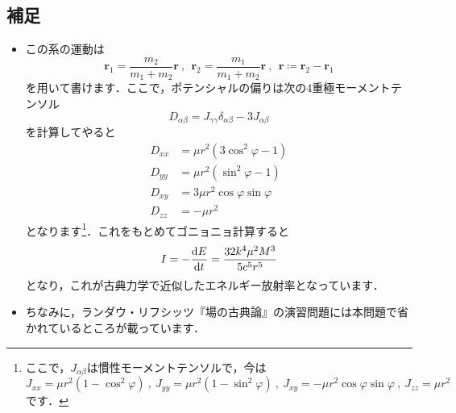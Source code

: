 \documentclass[a4paper,pdflatex,ja=standard]{bxjsarticle}
\begin{document}
\subsection*{補足}

\begin{itemize}
  \item 
  この系の運動は
  \begin{equation}
    \bm{r}_{1}
    =
    \frac{m_{2}}{m_{1}+m_{2}}\bm{r}
    \ ,\ \ 
    \bm{r}_{2}
    =
    \frac{m_{1}}{m_{1}+m_{2}}\bm{r}
    \ ,\ \ 
    \bm{r}
    \coloneqq
    \bm{r}_{2}-\bm{r}_{1}
  \end{equation}
  を用いて書けます．ここで，ポテンシャルの偏りは次の4重極モーメントテンソル
  \begin{equation}
    D_{\alpha\beta}
    =
    J_{\gamma\gamma}\delta_{\alpha\beta}
    -
    3J_{\alpha\beta}
  \end{equation}
  を計算してやると
  \begin{equation}
    \begin{alignedat}{1}  
      D_{xx}
      &=
      \mu r^2(3\cos^2\varphi -1)
      \\
      D_{yy}
      &=
      \mu r^2(\sin^2\varphi-1)
      \\
      D_{xy}
      &=
      3\mu r^2\cos\varphi\sin\varphi
      \\
      D_{zz}
      &=
      -\mu r^2
    \end{alignedat}
  \end{equation}
  となります\footnote{
    ここで，$J_{\alpha\beta}$は慣性モーメントテンソルで，今は
    \begin{equation}
      J_{xx}
      =
      \mu r^2(1-\cos^2\varphi)
      \ ,\  
      J_{yy}
      =
      \mu r^2(1-\sin^2\varphi)
      \ ,\  
      J_{xy}
      =
      -\mu r^2\cos\varphi\sin\varphi
      \ , \ 
      J_{zz}
      =
      \mu r^2
    \end{equation}
    です．
  }．これをもとめてゴニョニョ計算すると
  \begin{equation}
    I
    =
    -\dv{E}{t}
    =
    \frac{32k^4\mu^2M^3}{5c^5r^5}
  \end{equation}
  となり，これが古典力学で近似したエネルギー放射率となっています．

  \item 
  ちなみに，ランダウ・リフシッツ『場の古典論』の演習問題には本問題で省かれているところが載っています．

\end{itemize}
\end{document}
